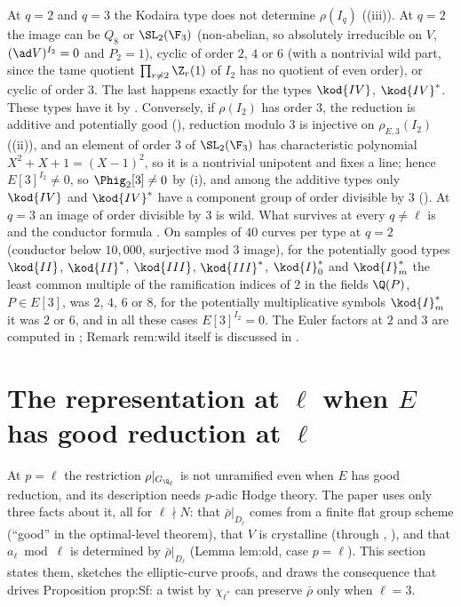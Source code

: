 \begin{remark}\label{rem:galrep:wild-inertia}
At $q=2$ and $q=3$ the Kodaira type does not determine $\rho(I_q)$ ((iii)). At $q=2$ the image can be $Q_8$ or $\SL_2(\F_3)$
(non-abelian, so absolutely irreducible on $V$, $(\ad V)^{I_2}=0$ and $P_2=1$), cyclic of order $2$, $4$ or $6$ (with a nontrivial wild part, since the tame
quotient $\prod_{r\ne2}\Z_r(1)$ of $I_2$ has no quotient of even order), or cyclic of order $3$. The last happens exactly for the types $\kod{IV}$, $\kod{IV}^*$.
These types have it by . Conversely, if $\rho(I_2)$ has order $3$, the reduction is additive and potentially good
(), reduction modulo $3$ is injective on $\rho_{E,3}(I_2)$ ((ii)), and an element of order $3$ of
$\SL_2(\F_3)$ has characteristic polynomial $X^2+X+1=(X-1)^2$, so it is a nontrivial unipotent and fixes a line; hence $E[3]^{I_2}\ne0$, so
$\Phig_2[3]\ne0$ by (i), and among the additive types only $\kod{IV}$ and $\kod{IV}^*$ have a component group of order
divisible by $3$ (). At $q=3$ an image of order divisible by $3$ is wild.
What survives at every $q\ne\ell$ is  and the conductor formula . On samples
of $40$ curves per type at $q=2$ (conductor below $10{,}000$, surjective mod $3$ image), for the potentially good types $\kod{II}$, $\kod{II}^*$, $\kod{III}$,
$\kod{III}^*$, $\kod{I}_0^*$ and $\kod{I}_m^*$ the least common multiple of the ramification indices of $2$ in the fields $\Q(P)$, $P\in E[3]$, was $2$, $4$, $6$ or $8$,
for the potentially multiplicative symbols $\kod{I}_m^*$ it was $2$ or $6$, and in all these cases $E[3]^{I_2}=0$. The Euler factors at $2$ and $3$ are
computed in ; Remark rem:wild itself is discussed in .
\end{remark}

\section[The representation at \texorpdfstring{$\ell$}{l}]{The representation at \texorpdfstring{$\ell$}{l} when \texorpdfstring{$E$}{E} has good reduction at \texorpdfstring{$\ell$}{l}}\label{sec:galrep:at-l}

At $p=\ell$ the restriction $\rho|_{G_{\Q_\ell}}$ is not unramified even when $E$ has good reduction, and its description needs $p$-adic Hodge
theory. The paper uses only three facts about it, all for $\ell\nmid N$: that $\bar\rho|_{D_\ell}$ comes from a finite flat group scheme (``good'' in the
optimal-level theorem), that $V$ is crystalline (through \cite{DFG04}, ), and that $a_\ell\bmod\ell$ is determined by $\bar\rho|_{D_\ell}$
(Lemma lem:old, case $p=\ell$). This section states them, sketches the elliptic-curve proofs, and draws the consequence that drives
Proposition prop:Sf: a twist by $\chi_{\ell^*}$ can preserve $\bar\rho$ only when $\ell=3$.

